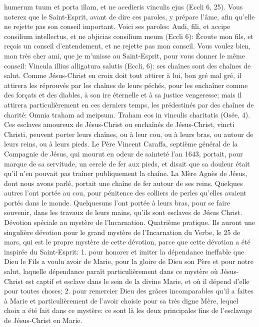 humerum tuum et porta illam, et ne acedieris vinculis ejus (Eccli 6, 25). Vous noterez que le Saint-Esprit, avant de
dire ces paroles, y prépare l'âme, afin qu'elle ne rejette pas son conseil important. Voici ses paroles: Audi, fili, et
accipe consilium intellectus, et ne abjicias consilium meum (Eccli 6): Écoute mon fils, et reçois un conseil
d'entendement, et ne rejette pas mon conseil.
 Vous voulez bien, mon très cher ami, que je m'unisse au Saint-Esprit, pour vous donner le même conseil:
Vincula illius alligatura salutis (Eccli, 6): ses chaînes sont des chaînes de salut. Comme Jésus-Christ en croix doit
tout attirer à lui, bon gré mal gré, il attirera les réprouvés par les chaînes de leurs péchés, pour les enchaîner
comme des forçats et des diables, à son ire éternelle et à sa justice vengeresse; mais il attirera particulièrement en
ces derniers temps, les prédestinés par des chaînes de charité: Omnia traham ad meipsum. Traham eos in vinculis
charitatis (Osée, 4).
 Ces esclaves amoureux de Jésus-Christ ou enchaînés de Jésus-Christ, vincti Christi, peuvent porter leurs
chaînes, ou à leur cou, ou à leurs bras, ou autour de leurs reins, ou à leurs pieds. Le Père Vincent Caraffa,
septième général de la Compagnie de Jésus, qui mourut en odeur de sainteté l'an 1643, portait, pour marque de
sa servitude, un cercle de fer aux pieds, et disait que sa douleur était qu'il n'en pouvait pas traîner publiquement la
chaîne. La Mère Agnès de Jésus, dont nous avons parlé, portait une chaîne de fer autour de ses reins. Quelques
autres l'ont portée au cou, pour pénitence des colliers de perles qu'elles avaient portés dans le monde. Quelquesuns l'ont portée à leurs bras, pour se faire souvenir, dans les travaux de leurs mains, qu'ils sont esclaves de Jésus Christ.
Dévotion spéciale au mystère de l'lncarnation.
 Quatrième pratique. Ils auront une singulière dévotion pour le grand mystère de l'Incarnation du Verbe, le 25
de mars, qui est le propre mystère de cette dévotion, parce que cette dévotion a été inspirée du Saint-Esprit: 1.
pour honorer et imiter la dépendance ineffable que Dieu le Fils a voulu avoir de Marie, pour la gloire de Dieu son
Père et pour notre salut, laquelle dépendance paraît particulièrement dans ce mystère où Jésus-Christ est captif et
esclave dans le sein de la divine Marie, et où il dépend d'elle pour toutes choses; 2. pour remercier Dieu des
grâces incomparables qu'il a faites à Marie et particulièrement de l'avoir choisie pour sa très digne Mère, lequel
choix a été fait dans ce mystère: ce sont là les deux principales fins de l'esclavage de Jésus-Christ en Marie.
